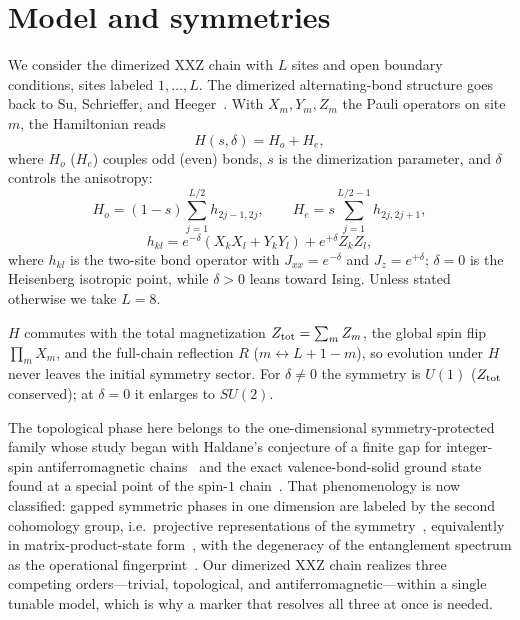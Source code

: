 \section{Model and symmetries}
\label{sec:model}

We consider the dimerized XXZ chain with $L$ sites and open boundary
conditions, sites labeled $1,\dots,L$. The dimerized alternating-bond
structure goes back to Su, Schrieffer, and Heeger~\cite{su1979solitons}. With $X_m,Y_m,Z_m$ the Pauli
operators on site $m$, the Hamiltonian reads
\begin{equation}
H(s,\delta)=H_o+H_e,
\end{equation}
where $H_o$ ($H_e$) couples odd (even) bonds, $s$ is the dimerization
parameter, and $\delta$ controls the anisotropy:
\begin{equation}
H_o=(1-s)\sum_{j=1}^{L/2}h_{2j-1,2j},\qquad
H_e=s\sum_{j=1}^{L/2-1}h_{2j,2j+1},
\end{equation}
\begin{equation}
h_{kl}=e^{-\delta}(X_kX_l+Y_kY_l)+e^{+\delta}Z_kZ_l,
\end{equation}
where $h_{kl}$ is the two-site bond operator with
$J_{xx}=e^{-\delta}$ and $J_z=e^{+\delta}$; $\delta=0$ is the Heisenberg
isotropic point, while $\delta>0$ leans toward Ising.
Unless stated otherwise we take $L=8$.

$H$ commutes with the total magnetization
$Z_{\rm tot}=\sum_m Z_m$, the global spin flip $\prod_m X_m$, and the
full-chain reflection $R$ ($m\leftrightarrow L+1-m$), so evolution under
$H$ never leaves the initial symmetry sector. For $\delta\ne0$ the symmetry is $U(1)$ ($Z_{\rm tot}$
conserved); at $\delta=0$ it enlarges to $SU(2)$.

The topological phase here belongs to the one-dimensional
symmetry-protected family whose study began with Haldane's conjecture
of a finite gap for integer-spin antiferromagnetic
chains~\cite{haldane1983nonlinear,dennijs1989preroughening} and the
exact valence-bond-solid ground state found at a special point of the
spin-$1$ chain~\cite{affleck1987rigorous,dennijs1989preroughening}.
That phenomenology is now classified: gapped symmetric phases in one
dimension are labeled by the second cohomology group, i.e.\ projective
representations of the symmetry~\cite{chen2011classification}, equivalently
in matrix-product-state
form~\cite{schuch2011classifying}, with the degeneracy of the
entanglement spectrum as the operational
fingerprint~\cite{pollmann2010entanglement,li2008entanglement}.
Our dimerized XXZ chain realizes three competing orders---trivial,
topological, and antiferromagnetic---within a single tunable model,
which is why a marker that resolves all three at once is needed.


